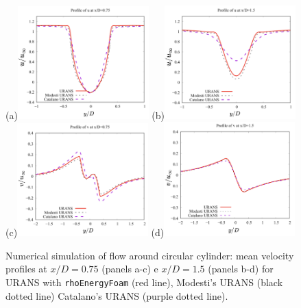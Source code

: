 \documentclass[a5paper]{sapthesis}
\begin{document}
	\begin{figure}
		\centering
		(a){\includegraphics[width=0.45\textwidth]{Figures/Cylinder_u_075}}
		(b){\includegraphics[width=0.45\textwidth]{Figures/Cylinder_u_150}}\\
		(c){\includegraphics[width=0.45\textwidth]{Figures/Cylinder_v_075}}
		(d){\includegraphics[width=0.45\textwidth]{Figures/Cylinder_v_150}}
		\caption[Velocity profiles of a URANS for a flow around cylinder]{Numerical simulation of ﬂow around circular cylinder: mean velocity proﬁles at $x/D = 0.75$ (panels a-c) e $x/D = 1.5$ (panels b-d) for URANS with \texttt{rhoEnergyFoam} (red line), Modesti's URANS (black dotted line) Catalano's URANS (purple dotted line).}
		\label{Cylinder}
	\end{figure}
	
\end{document}
